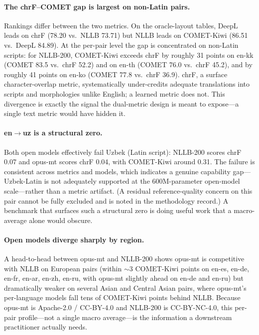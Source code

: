\documentclass[11pt]{article}
\begin{document}
\paragraph{The chrF--COMET gap is largest on non-Latin pairs.} Rankings differ
between the two metrics. On the oracle-layout tables, DeepL leads on chrF
(78.20 vs.\ NLLB 73.71) but NLLB leads on COMET-Kiwi (86.51 vs.\ DeepL 84.89).
At the per-pair level the gap is concentrated on non-Latin scripts: for NLLB-200,
COMET-Kiwi exceeds chrF by roughly 31 points on en-kk (COMET 83.5 vs.\ chrF
52.2) and on en-th (COMET 76.0 vs.\ chrF 45.2), and by roughly 41 points on
en-ko (COMET 77.8 vs.\ chrF 36.9). chrF, a surface character-overlap metric,
systematically under-credits adequate translations into scripts and morphologies
unlike English; a learned metric does not. This divergence is exactly the
signal the dual-metric design is meant to expose---a single text metric would
have hidden it.

\paragraph{en$\rightarrow$uz is a structural zero.} Both open models effectively
fail Uzbek (Latin script): NLLB-200 scores chrF 0.07 and opus-mt scores chrF
0.04, with COMET-Kiwi around 0.31. The failure is consistent across metrics and
models, which indicates a genuine capability gap---Uzbek-Latin is not adequately
supported at the 600M-parameter open-model scale---rather than a metric
artifact. (A residual reference-quality concern on this pair cannot be fully
excluded and is noted in the methodology record.) A benchmark that surfaces such
a structural zero is doing useful work that a macro-average alone would obscure.

\paragraph{Open models diverge sharply by region.} A head-to-head between
opus-mt and NLLB-200 shows opus-mt is competitive with NLLB on European pairs
(within $\sim$3 COMET-Kiwi points on en-es, en-de, en-fr, en-ar, en-zh, en-ru,
with opus-mt slightly ahead on en-de and en-ru) but dramatically weaker on
several Asian and Central Asian pairs, where opus-mt's per-language models fall
tens of COMET-Kiwi points behind NLLB. Because opus-mt is Apache-2.0 / CC-BY-4.0
and NLLB-200 is CC-BY-NC-4.0, this per-pair profile---not a single macro
average---is the information a downstream practitioner actually needs.
\end{document}
